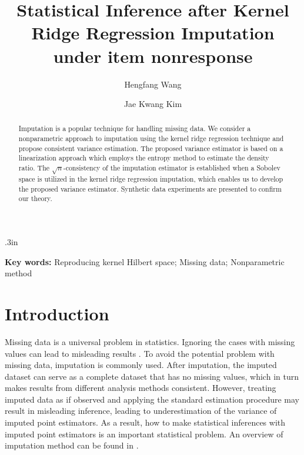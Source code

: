 \documentclass[12pt]{article}
\providecommand{\keywords}[1]{\textbf{Key words:} #1}
\begin{document}
\baselineskip .3in


\title{Statistical Inference after Kernel Ridge Regression Imputation under item nonresponse}

\author{Hengfang Wang \and Jae Kwang Kim}

\date{} 

\maketitle

\begin{abstract}
Imputation is a popular technique for handling missing data. 
We consider a nonparametric approach to imputation using the kernel ridge regression technique and {propose consistent variance estimation}. The proposed variance estimator is based on a linearization approach which employs the entropy method to estimate the density ratio.
The $\sqrt{n}$-consistency of the imputation estimator is established when a Sobolev space is utilized in the kernel ridge regression imputation, which enables us to develop the proposed variance estimator.
Synthetic data experiments are presented to confirm our theory. 
\end{abstract}

\keywords{Reproducing kernel Hilbert space;  Missing data; Nonparametric method}



%
%

\newpage 

 
\section{Introduction}



Missing data is a universal problem in statistics.  Ignoring the cases with missing values  can lead to  misleading results \citep{kim2013statistical, little2019statistical}. To avoid the potential problem with missing data, imputation is commonly used.  
 After imputation, the imputed dataset can serve as a complete dataset that has no missing values, which in turn makes results from different analysis methods consistent. However, treating imputed data as if observed and applying the standard estimation procedure may result in misleading inference, leading to  underestimation of the variance  of  imputed point estimators.  As a result, how to make statistical {inferences} with  {imputed point estimators} is an important statistical problem. 
An overview of imputation method can be found in \citet{haziza2009imputation}. 
\end{document}
